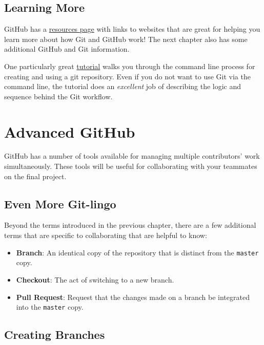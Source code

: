 \documentclass[]{book}
\providecommand{\tightlist}{%
  \setlength{\itemsep}{0pt}\setlength{\parskip}{0pt}}
\theoremstyle{definition}
\theoremstyle{definition}
\theoremstyle{remark}
\begin{document}
\section{Learning More}\label{learning-more}

GitHub has a
\href{https://help.github.com/articles/good-resources-for-learning-git-and-github/}{resources
page} with links to websites that are great for helping you learn more
about how Git and GitHub work! The next chapter also has some additional
GitHub and Git information.

One particularly great \href{https://try.github.io/}{tutorial} walks you
through the command line process for creating and using a git
repository. Even if you do not want to use Git via the command line, the
tutorial does an \emph{excellent} job of describing the logic and
sequence behind the Git workflow.

\chapter{Advanced GitHub}\label{advanced-github}

GitHub has a number of tools available for managing multiple
contributors' work simultaneously. These tools will be useful for
collaborating with your teammates on the final project.

\section{Even More Git-lingo}\label{even-more-git-lingo}

Beyond the terms introduced in the previous chapter, there are a few
additional terms that are specific to collaborating that are helpful to
know:

\begin{itemize}
\tightlist
\item
  \textbf{Branch}: An identical copy of the repository that is distinct
  from the \texttt{master} copy.
\item
  \textbf{Checkout}: The act of switching to a new branch.
\item
  \textbf{Pull Request}: Request that the changes made on a branch be
  integrated into the \texttt{master} copy.
\end{itemize}

\section{Creating Branches}\label{creating-branches}
\end{document}
